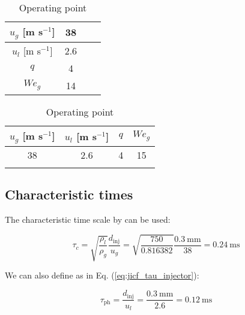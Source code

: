 \begin{table}[!h]
\centering
\caption{Operating point}
\begin{tabular}{cccc}
\thickhline
$u_g$ [m s$^{-1}$] &  38 \\
\hline
$u_l$ [m s$^{-1}$] &  2.6 \\
\hline
\hline
$q$ & 4 \\ %
\hline
$We_g$ & 14 \\
\hline
\end{tabular}
\label{tab:bimer_sps_operating_point}
\end{table}

\begin{table}[!h]
\centering
\caption{Operating point}
\begin{tabular}{cccc}
\thickhline
$u_g$ [m s$^{-1}$] &  $u_l$ [m s$^{-1}$] & $q$ &  $We_g$  \\
\hline
38 &  2.6 & 4 & 15 \\
\thickhline
\end{tabular}
\label{tab:bimer_sps_operating_point}
\end{table}




\subsection{Characteristic times}

The characteristic time scale by  can be used:

\begin{equation}
\tau_c = \sqrt{\frac{\rho_l}{\rho_g}} \frac{d_\mathrm{inj}}{u_g} = \sqrt{\frac{750}{0.816382 }} \frac{0.3 ~\mathrm{mm}}{38} = 0.24 ~\mathrm{ms}
\end{equation}

We can also define as in Eq. (\ref{eq:jicf_tau_injector}):

\begin{equation}
\tau_\mathrm{ph} = \frac{d_\mathrm{inj}}{u_l} = \frac{0.3 ~\mathrm{mm}}{2.6} = 0.12 ~\mathrm{ms}
\end{equation}

